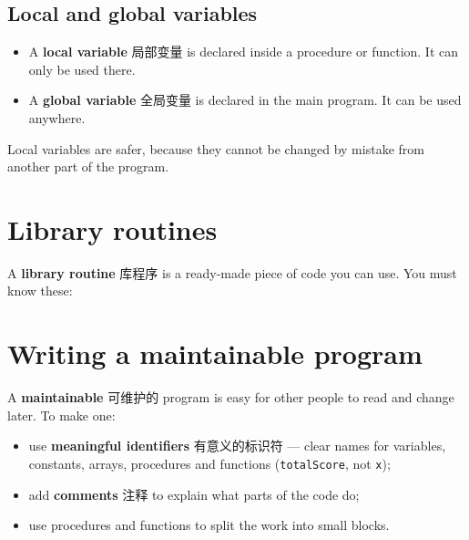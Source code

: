 \documentclass[11pt]{article}
\begin{document}
\subsection*{Local and global variables}

\begin{itemize}
\item A \textbf{local variable} 局部变量 is declared inside a procedure or function. It can only be used there.

\item A \textbf{global variable} 全局变量 is declared in the main program. It can be used anywhere.

\end{itemize}

Local variables are safer, because they cannot be changed by mistake from another part of the program.

\section*{Library routines}

A \textbf{library routine} 库程序 is a ready-made piece of code you can use. You must know these:

\begin{center}
\end{center}

\section*{Writing a maintainable program}

A \textbf{maintainable} 可维护的 program is easy for other people to read and change later. To make one:

\begin{itemize}
\item use \textbf{meaningful identifiers} 有意义的标识符 — clear names for variables, constants, arrays, procedures and functions (\texttt{totalScore}, not \texttt{x});

\item add \textbf{comments} 注释 to explain what parts of the code do;

\item use procedures and functions to split the work into small blocks.

\end{itemize}
\end{document}
